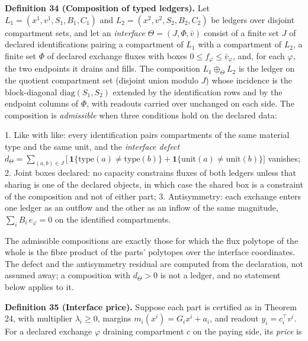 \documentclass[11pt]{article}
\begin{document}
\textbf{Definition 34 (Composition of typed ledgers).} Let \(L_1 =\allowbreak{} (x^1,\allowbreak{} v^1,\allowbreak{} S_1,\allowbreak{} B_1,\allowbreak{} C_1)\) and \(L_2 =\allowbreak{} (x^2,\allowbreak{} v^2,\allowbreak{} S_2,\allowbreak{} B_2,\allowbreak{} C_2)\) be ledgers over disjoint compartment sets, and let an \emph{interface} \(\Theta = (J, \Phi, \bar v)\) consist of a finite set \(J\) of declared identifications pairing a compartment of \(L_1\) with a compartment of \(L_2\), a finite set \(\Phi\) of declared exchange fluxes with boxes \(0 \le f_\varphi \le \bar v_\varphi\), and, for each \(\varphi\), the two endpoints it drains and fills. The composition \(L_1 \oplus_\Theta L_2\) is the ledger on the quotient compartment set (disjoint union modulo \(J\)) whose incidence is the block-diagonal \(\mathrm{diag}(S_1, S_2)\) extended by the identification rows and by the endpoint columns of \(\Phi\), with readouts carried over unchanged on each side. The composition is \emph{admissible} when three conditions hold on the declared data:

1. Like with like: every identification pairs compartments of the same material type and the same unit, and the \emph{interface defect} \(d_\Theta =\allowbreak{} \sum_{(a,\allowbreak{}b) \in J} \bigl[\,\allowbreak{}\mathbf 1\{\mathrm{type}(a) \ne \mathrm{type}(b)\} +\allowbreak{} \mathbf 1\{\mathrm{unit}(a) \ne \mathrm{unit}(b)\}\bigr]\) vanishes; 2. Joint boxes declared: no capacity constrains fluxes of both ledgers unless that sharing is one of the declared objects, in which case the shared box is a constraint of the composition and not of either part; 3. Antisymmetry: each exchange enters one ledger as an outflow and the other as an inflow of the same magnitude, \(\textstyle\sum_{i} B_i\,\allowbreak{} e_\varphi =\allowbreak{} 0\) on the identified compartments.

The admissible compositions are exactly those for which the flux polytope of the whole is the fibre product of the parts' polytopes over the interface coordinates. The defect and the antisymmetry residual are computed from the declaration, not assumed away; a composition with \(d_\Theta > 0\) is not a ledger, and no statement below applies to it.

\textbf{Definition 35 (Interface price).} Suppose each part is certified as in Theorem 24, with multiplier \(\lambda_i \ge 0\), margins \(m_i(x^i) = G_i x^i + a_i\), and readout \(y_i = c_i^{\top} v^i\). For a declared exchange \(\varphi\) draining compartment \(c\) on the paying side, its \emph{price} is 
\end{document}
